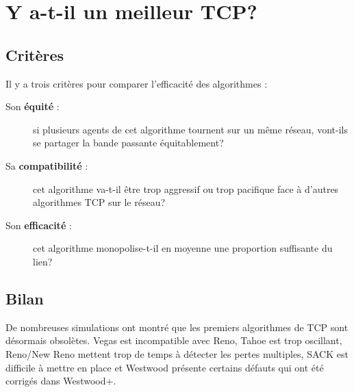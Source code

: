 \documentclass[	DIV=calc,%
							paper=a4,%
							fontsize=11pt,%
							twocolumn]{scrartcl}	 					%
\begin{document}
\section*{Y a-t-il un meilleur TCP?}
\subsection*{Critères}
Il y a trois critères pour comparer l'efficacité des algorithmes :
\begin{description}
\item[Son \textbf{équité} :]{si plusieurs agents de cet algorithme tournent sur un même réseau, vont-ils se partager la bande passante équitablement?}
\item[Sa \textbf{compatibilité} :]{cet algorithme va-t-il être trop aggressif ou trop pacifique face à d'autres algorithmes TCP sur le réseau?}
\item[Son \textbf{efficacité} :]{cet algorithme monopolise-t-il en moyenne une proportion suffisante du lien?} 	
\end{description}
\subsection*{Bilan}
De nombreuses simulations ont montré que les premiers algorithmes de TCP sont désormais obsolètes. Vegas est incompatible avec Reno, Tahoe est trop oscillant, Reno/New Reno mettent trop de temps à détecter les pertes multiples, SACK est difficile à mettre en place et Westwood présente certains défauts qui ont été corrigés dans Westwood+.
\end{document}
